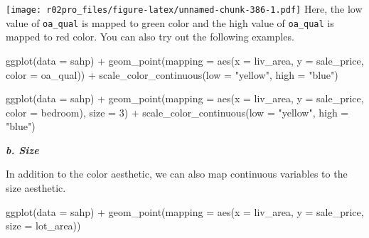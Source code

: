 \documentclass[
]{book}
\newenvironment{Shaded}{\begin{snugshade}}{\end{snugshade}}
\newcommand{\AttributeTok}[1]{\textcolor[rgb]{0.77,0.63,0.00}{#1}}
\newcommand{\DecValTok}[1]{\textcolor[rgb]{0.00,0.00,0.81}{#1}}
\newcommand{\FunctionTok}[1]{\textcolor[rgb]{0.00,0.00,0.00}{#1}}
\newcommand{\NormalTok}[1]{#1}
\newcommand{\SpecialCharTok}[1]{\textcolor[rgb]{0.00,0.00,0.00}{#1}}
\newcommand{\StringTok}[1]{\textcolor[rgb]{0.31,0.60,0.02}{#1}}
\begin{document}
\texttt{[image: r02pro\_files/figure-latex/unnamed-chunk-386-1.pdf]}
Here, the low value of \texttt{oa\_qual} is mapped to green color and the high value of \texttt{oa\_qual} is mapped to red color. You can also try out the following examples.

\begin{Shaded}
\begin{Highlighting}[]
\FunctionTok{ggplot}\NormalTok{(}\AttributeTok{data =}\NormalTok{ sahp) }\SpecialCharTok{+} \FunctionTok{geom\_point}\NormalTok{(}\AttributeTok{mapping =} \FunctionTok{aes}\NormalTok{(}\AttributeTok{x =}\NormalTok{ liv\_area, }\AttributeTok{y =}\NormalTok{ sale\_price, }\AttributeTok{color =}\NormalTok{ oa\_qual)) }\SpecialCharTok{+} \FunctionTok{scale\_color\_continuous}\NormalTok{(}\AttributeTok{low =} \StringTok{"yellow"}\NormalTok{, }\AttributeTok{high =} \StringTok{"blue"}\NormalTok{)}
\end{Highlighting}
\end{Shaded}

\begin{Shaded}
\begin{Highlighting}[]
\FunctionTok{ggplot}\NormalTok{(}\AttributeTok{data =}\NormalTok{ sahp) }\SpecialCharTok{+} \FunctionTok{geom\_point}\NormalTok{(}\AttributeTok{mapping =} \FunctionTok{aes}\NormalTok{(}\AttributeTok{x =}\NormalTok{ liv\_area, }\AttributeTok{y =}\NormalTok{ sale\_price, }\AttributeTok{color =}\NormalTok{ bedroom), }\AttributeTok{size =} \DecValTok{3}\NormalTok{) }\SpecialCharTok{+} \FunctionTok{scale\_color\_continuous}\NormalTok{(}\AttributeTok{low =} \StringTok{"yellow"}\NormalTok{, }\AttributeTok{high =} \StringTok{"blue"}\NormalTok{)}
\end{Highlighting}
\end{Shaded}

\textbf{\emph{b. Size}}

In addition to the color aesthetic, we can also map continuous variables to the size aesthetic.

\begin{Shaded}
\begin{Highlighting}[]
\FunctionTok{ggplot}\NormalTok{(}\AttributeTok{data =}\NormalTok{ sahp) }\SpecialCharTok{+} \FunctionTok{geom\_point}\NormalTok{(}\AttributeTok{mapping =} \FunctionTok{aes}\NormalTok{(}\AttributeTok{x =}\NormalTok{ liv\_area, }\AttributeTok{y =}\NormalTok{ sale\_price, }\AttributeTok{size =}\NormalTok{ lot\_area))}
\end{Highlighting}
\end{Shaded}
\end{document}
